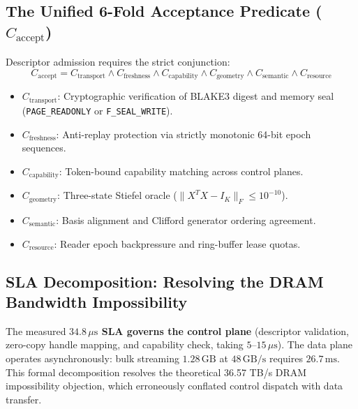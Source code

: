 \documentclass[journal,10pt,compsoc]{IEEEtran}
\theoremstyle{plain}
\theoremstyle{definition}
\begin{document}
\subsection{The Unified 6-Fold Acceptance Predicate ($C_{\text{accept}}$)}
Descriptor admission requires the strict conjunction:
\begin{equation}
\label{eq:caccept}
C_{\text{accept}} = C_{\text{transport}} \land C_{\text{freshness}} \land C_{\text{capability}} \land C_{\text{geometry}} \land C_{\text{semantic}} \land C_{\text{resource}}
\end{equation}
\begin{itemize}
    \item $C_{\text{transport}}$: Cryptographic verification of BLAKE3 digest and memory seal (\texttt{PAGE\_READONLY} or \texttt{F\_SEAL\_WRITE}).
    \item $C_{\text{freshness}}$: Anti-replay protection via strictly monotonic 64-bit epoch sequences.
    \item $C_{\text{capability}}$: Token-bound capability matching across control planes.
    \item $C_{\text{geometry}}$: Three-state Stiefel oracle ($\|X^T X - I_K\|_F \le 10^{-10}$).
    \item $C_{\text{semantic}}$: Basis alignment and Clifford generator ordering agreement.
    \item $C_{\text{resource}}$: Reader epoch backpressure and ring-buffer lease quotas.
\end{itemize}

\subsection{SLA Decomposition: Resolving the DRAM Bandwidth Impossibility}
The measured \textbf{$34.8\,\mu\text{s}$ SLA governs the control plane} (descriptor validation, zero-copy handle mapping, and capability check, taking $5\text{--}15\,\mu\text{s}$). The data plane operates asynchronously: bulk streaming $1.28\,\text{GB}$ at $48\,\text{GB/s}$ requires $26.7\,\text{ms}$. This formal decomposition resolves the theoretical 36.57 TB/s DRAM impossibility objection, which erroneously conflated control dispatch with data transfer.
\end{document}
